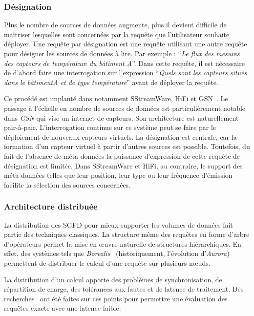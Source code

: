 \subsubsection{Désignation}\label{sec:rw:sgfd:infra:designation}
Plus le nombre de sources de données augmente, plus il devient difficile de maîtriser lesquelles sont concernées par la requête que l'utilisateur souhaite déployer. Une requête par désignation est une requête utilisant une autre requête pour désigner les sources de données à lire. Par exemple : \enquote{\it Le flux des mesures des capteurs de température du bâtiment A}. Dans cette requête, il est nécessaire de d'abord faire une interrogation sur l'expression \enquote{\it Quels sont les capteurs situés dans le bâtiment\textit{A} et de type \textit{température}} avant de déployer la requête.

Ce procédé est implanté dans notamment SStreamWare, HiFi et GSN~\cite{Aberer:gsn}. Le passage à l'échelle en nombre de sources de données est particulièrement notable dans \textit{GSN} qui vise un internet de capteurs. Son architecture est naturellement pair-à-pair. L'interrogation continue sur ce système peut se faire par le déploiement de nouveaux capteurs virtuels. La désignation est centrale, car la formation d'un capteur virtuel à partir d'autres sources est possible. Toutefois, du fait de l'absence de méta-données la puissance d'expression de cette requête de désignation est limitée. Dans SStreamWare et HiFi, au contraire, le support des méta-données telles que leur position, leur type ou leur fréquence d'émission facilite la sélection des sources concernées.

\subsubsection{Architecture distribuée}
La distribution des SGFD pour mieux supporter les volumes de données fait partie des techniques classiques. La structure même des requêtes en forme d'arbre d'opérateurs permet la mise en œuvre naturelle de structures hiérarchiques. En effet, des systèmes tels que \textit{Borealis}~\cite{Abadi:borealis} (historiquement, l'évolution d'\textit{Aurora}) permettent de distribuer le calcul d'une requête sur plusieurs nœuds.

La distribution d'un calcul apporte des problèmes de synchronisation, de répartition de charge, des tolérances aux fautes et de latence de traitement. Des recherches~\cite{Hwang:distributed, Tucker:heartbeat} ont été faites sur ces points pour permettre une évaluation des requêtes exacte avec une latence faible.


